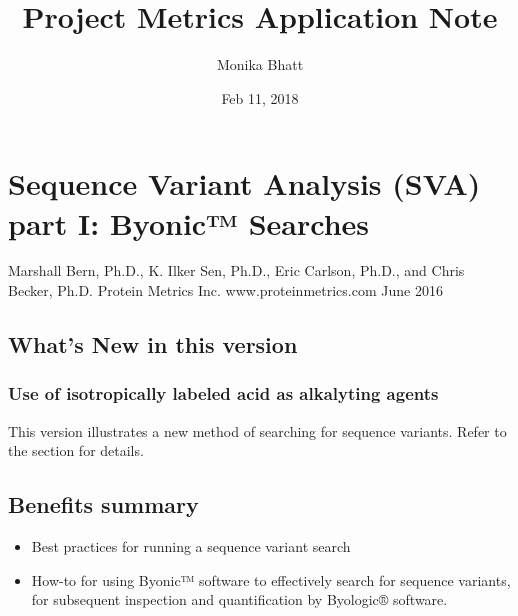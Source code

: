 \documentclass[letterpaper,10pt,oneside,english]{sphinxmanual}
\title{Project Metrics Application Note}
\date{Feb 11, 2018}
\author{Monika Bhatt}
\begin{document}
\maketitle
\sphinxtableofcontents
{}\label{\detokenize{index::doc}}



\chapter{Sequence Variant Analysis (SVA) part I: Byonic™ Searches}
\label{\detokenize{applicationnote:welcome-to-protein-metrics-s-documentation}}\label{\detokenize{applicationnote::doc}}\label{\detokenize{applicationnote:sequence-variant-analysis-sva-part-i-byonic-searches}}
Marshall Bern, Ph.D., K. Ilker Sen, Ph.D., Eric Carlson, Ph.D., and Chris Becker, Ph.D.
Protein Metrics Inc. www.proteinmetrics.com
June 2016


\section{What’s New in this version}
\label{\detokenize{applicationnote:what-s-new-in-this-version}}

\subsection{Use of isotropically labeled acid as alkalyting agents}
\label{\detokenize{applicationnote:use-of-isotropically-labeled-acid-as-alkalyting-agents}}
This version illustrates a new method of searching for sequence variants. Refer to the {\hyperref[\detokenize{applicationnote:discussion-regarding-the-use-of-isotopically-labeled-iodoacetic-acid-or-iodoacetimide-as-alkylating-agents}]{}} section for details.


\section{Benefits summary}
\label{\detokenize{applicationnote:benefits-summary}}\begin{itemize}
\item {} 
Best practices for running a sequence variant search

\item {} 
How-to for using Byonic™ software to effectively search for sequence variants, for subsequent inspection and quantification by Byologic® software.

\end{itemize}
\end{document}
